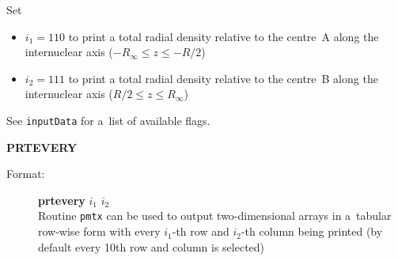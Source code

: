 \documentclass[12pt,a4paper]{article}
\newcommand{\ft}[1]{\texttt{#1}}
\begin{document}
\begin{description}
\begin{description}
Set
\begin{itemize}
\item $i_1=110$ to print a total radial density relative to the
  centre~A along the internuclear axis ($-R_{\infty}\le z\le -R/2$)

\item $i_2=111$ to print a total radial density relative to the
  centre~B along the internuclear axis ($R/2\le z\le R_{\infty}$)
\end{itemize}
See \ft{inputData} for a~list of available flags.

\end{description}


\item \textbf{PRTEVERY}
\begin{description}
\item[Format:] \textbf{prtevery} $i_1$ $i_2$ \\ Routine \ft{pmtx} can be used to output
  two-dimensional arrays in a~tabular row-wise form with every $i_1$-th row and $i_2$-th
  column being printed (by default every 10th row and column is selected)
\end{description}



\end{description}
\end{document}
